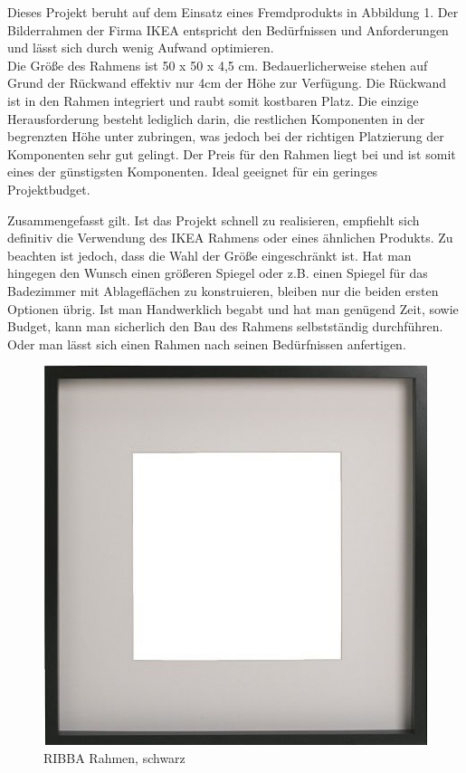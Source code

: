 Dieses Projekt beruht auf dem Einsatz eines Fremdprodukts in Abbildung 1. Der Bilderrahmen der Firma IKEA entspricht den Bedürfnissen und Anforderungen und lässt sich durch wenig Aufwand optimieren. \\
Die Größe des Rahmens ist 50 x 50 x 4,5 cm. Bedauerlicherweise stehen auf Grund der Rückwand effektiv nur 4cm der Höhe zur Verfügung. Die Rückwand ist in den Rahmen integriert und raubt somit kostbaren Platz. Die einzige Herausforderung besteht lediglich darin, die restlichen Komponenten in der begrenzten Höhe unter zubringen, was jedoch bei der richtigen Platzierung der Komponenten sehr gut gelingt. Der Preis für den Rahmen liegt bei  und ist somit eines der günstigsten Komponenten. Ideal geeignet für ein geringes Projektbudget.

Zusammengefasst gilt. Ist das Projekt schnell zu realisieren, empfiehlt sich definitiv die Verwendung des IKEA Rahmens oder eines ähnlichen Produkts. Zu beachten ist jedoch, dass die Wahl der Größe eingeschränkt ist. Hat man hingegen den Wunsch einen größeren Spiegel oder z.B. einen Spiegel für das Badezimmer mit Ablageflächen zu konstruieren, bleiben nur die beiden ersten Optionen übrig. Ist man Handwerklich begabt und hat man genügend Zeit, sowie Budget, kann man sicherlich den Bau des Rahmens selbstständig durchführen. Oder man lässt sich einen Rahmen nach seinen Bedürfnissen anfertigen.

\begin{figure}
	\vspace{-20pt}
	\begin{center}
		\includegraphics[scale=0.4]{bilder/ribba-rahmen-schwarz.jpg}
	\end{center}
	\caption{RIBBA Rahmen, schwarz}
	\vspace{-10pt}
\end{figure}


